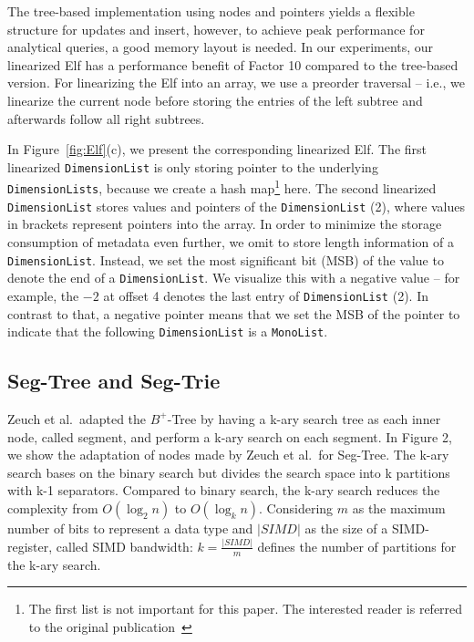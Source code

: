 \documentclass[runningheads,a4paper]{llncs}
\begin{document}
The tree-based implementation using nodes and pointers yields a flexible structure for updates and insert, however, to achieve peak performance for analytical queries, a good memory layout is needed. In our experiments, our linearized Elf has a performance benefit of Factor 10 compared to the tree-based version. For linearizing the Elf into an array, we use a preorder traversal -- i.e., we linearize the current node before storing the entries of the left subtree and afterwards follow all right subtrees.

In Figure~\ref{fig:Elf}(c), we present the corresponding linearized Elf. The first linearized \verb.DimensionList. is only storing pointer to the underlying \verb.DimensionLists., because we create a hash map\footnote{The first list is not important for this paper. The interested reader is referred to the original publication~\cite{BKS+17}} here. The second linearized \verb.DimensionList. stores values and pointers of the \verb.DimensionList. (2), where values in brackets represent pointers into the array. In order to minimize the storage consumption of metadata even further, we omit to store length information of a \verb.DimensionList.. Instead, we set the most significant bit (MSB) of the value to denote the end of a \verb.DimensionList.. We visualize this with a negative value -- for example, the $-2$ at offset 4 denotes the last entry of \verb.DimensionList. (2). In contrast to that, a negative pointer means that we set the MSB of the pointer to indicate that the following \verb.DimensionList. is a \verb.MonoList..





\subsection{Seg-Tree and Seg-Trie}\label{SCM}
Zeuch et al.\ adapted the $B^+$-Tree by having a k-ary search tree as each inner node, called segment, and perform a k-ary search on each segment.  In Figure 2, we show the adaptation of nodes made by Zeuch et al.\ for Seg-Tree. The k-ary search bases on the binary search but divides the search space into k partitions with k-1 separators. Compared to binary search, the k-ary search reduces the complexity from $O(\log_{2}{n})$ to $O(\log_{k}{n})$. Considering $m$ as the maximum number of bits to represent a data type and $\vert SIMD \vert$ as the size of a SIMD-register, called SIMD bandwidth: $k = \frac{\vert SIMD \vert }{m}$ defines the number of partitions for the k-ary search. 
\end{document}
